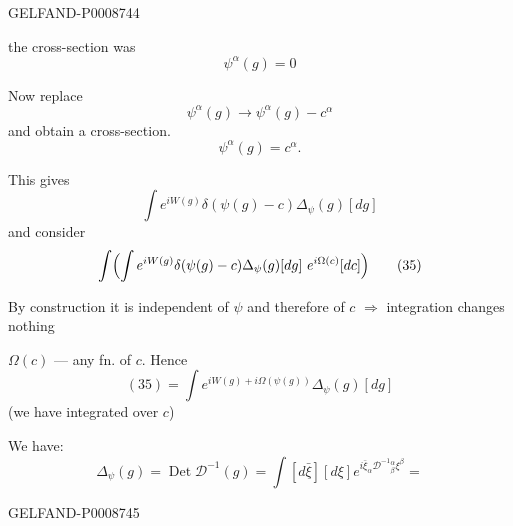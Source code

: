 \begin{GelfandAdjacentEvidence}{GELFAND-P000874}{4}


the cross-section was
\begin{equation*}
\psi^\alpha(g)=0
\tag{31}
\end{equation*}

Now replace
\begin{equation*}
\psi^\alpha(g)\longrightarrow\psi^\alpha(g)-c^\alpha
\tag{32}
\end{equation*}
and obtain a cross-section.
\begin{equation*}
\psi^\alpha(g)=c^\alpha.
\tag{33}
\end{equation*}

This gives
\begin{equation*}
\int e^{iW(g)}\delta(\psi(g)-c)\Delta_\psi(g)[dg]
\tag{34}
\end{equation*}
and consider
\begin{equation*}
\int\Bigl(\int e^{iW(g)}\delta(\psi(g)-c)\Delta_\psi(g)[dg]\ e^{i\Omega(c)}[dc]\Bigr)
\tag{35}
\end{equation*}

By construction it is independent of $\psi$ and therefore of $c$ $\Rightarrow$ integration changes nothing

$\Omega(c)$ --- any fn. of $c$. Hence
\begin{equation*}
(35)=\int e^{iW(g)+i\Omega(\psi(g))}\Delta_\psi(g)[dg]
\tag{36}
\end{equation*}
(we have integrated over $c$)

We have:
\begin{equation*}
\Delta_\psi(g)=\operatorname{Det}\mathcal D^{-1}(g)
=\int[d\bar\xi][d\xi]e^{i\bar\xi_\alpha\mathcal D^{-1}{}^\alpha_\beta\xi^\beta}=
\tag{37}
\end{equation*}
\end{GelfandAdjacentEvidence}
\begin{GelfandAdjacentEvidence}{GELFAND-P000874}{5}

\end{GelfandAdjacentEvidence}



